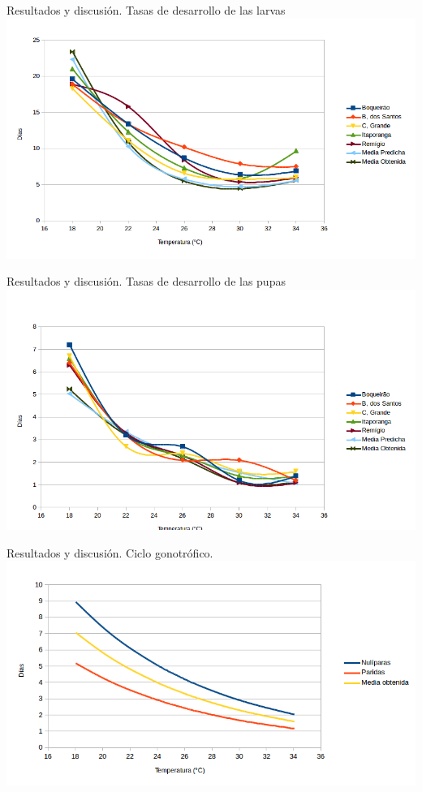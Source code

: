 \begin{frame}[t]{Resultados y discusión. Tasas de desarrollo de las larvas}
    \includegraphics[width=\textwidth]{./graphics/larvas-desarrollo.png}
\end{frame}

\begin{frame}[c]{Resultados y discusión. Tasas de desarrollo de las pupas}
    \includegraphics[width=\textwidth]{./graphics/pupas-desarrollo.png}
\end{frame}

\begin{frame}[t]{Resultados y discusión. Ciclo gonotrófico.}
    \includegraphics[width=\textwidth]{./graphics/ciclo-gonotrofico-temperatura.png}
\end{frame}

